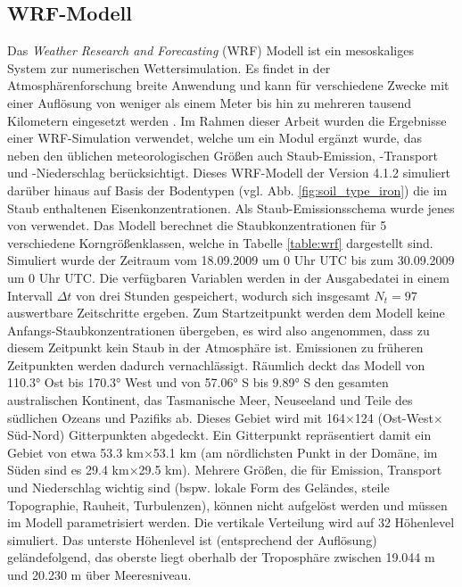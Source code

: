 \documentclass[12pt,a4paper,onecolumn]{scrartcl}
\begin{document}
\subsection{WRF-Modell} \label{sec:wrf}
Das \textit{Weather Research and Forecasting} (WRF) Modell ist ein mesoskaliges System zur numerischen Wettersimulation. Es findet in der Atmosphärenforschung breite Anwendung und kann für verschiedene Zwecke mit einer Auflösung von weniger als einem Meter bis hin zu mehreren tausend Kilometern eingesetzt werden \citep{NCAR.2021}. Im Rahmen dieser Arbeit wurden die Ergebnisse einer WRF-Simulation verwendet, welche um ein Modul ergänzt wurde, das neben den üblichen meteorologischen Größen auch Staub-Emission, -Transport und -Niederschlag berücksichtigt. Dieses WRF-Modell der Version 4.1.2 simuliert darüber hinaus auf Basis der Bodentypen (vgl. Abb. \ref{fig:soil_type_iron}) die im Staub enthaltenen Eisenkonzentrationen. Als Staub-Emissionsschema wurde jenes von \citet{Shao.2004} verwendet. Das Modell berechnet die Staubkonzentrationen für 5 verschiedene Korngrößenklassen, welche in Tabelle \ref{table:wrf} dargestellt sind. Simuliert wurde der Zeitraum vom 18.09.2009 um 0 Uhr UTC bis zum 30.09.2009 um 0 Uhr UTC. Die verfügbaren Variablen werden in der Ausgabedatei in einem Intervall $\Delta t$ von drei Stunden gespeichert, wodurch sich insgesamt $N_t = 97$ auswertbare Zeitschritte ergeben. Zum Startzeitpunkt werden dem Modell keine Anfangs-Staubkonzentrationen übergeben, es wird also angenommen, dass zu diesem Zeitpunkt kein Staub in der Atmosphäre ist. Emissionen zu früheren Zeitpunkten werden dadurch vernachlässigt. Räumlich deckt das Modell von 110.3° Ost bis 170.3° West und von 57.06° S bis 9.89° S den gesamten australischen Kontinent, das Tasmanische Meer, Neuseeland und Teile des südlichen Ozeans und Pazifiks ab. Dieses Gebiet wird mit 164$\times$124 (Ost-West$\times$Süd-Nord) Gitterpunkten abgedeckt. Ein Gitterpunkt repräsentiert damit ein Gebiet von etwa 53.3 km$\times$53.1 km (am nördlichsten Punkt in der Domäne, im Süden sind es 29.4 km$\times$29.5 km). Mehrere Größen, die für Emission, Transport und Niederschlag wichtig sind (bspw. lokale Form des Geländes, steile Topographie, Rauheit, Turbulenzen), können nicht aufgelöst werden und müssen im Modell parametrisiert werden. Die vertikale Verteilung wird auf 32 Höhenlevel simuliert. Das unterste Höhenlevel ist (entsprechend der Auflösung) geländefolgend, das oberste liegt oberhalb der Troposphäre zwischen 19.044 m und 20.230 m über Meeresniveau.
\end{document}
